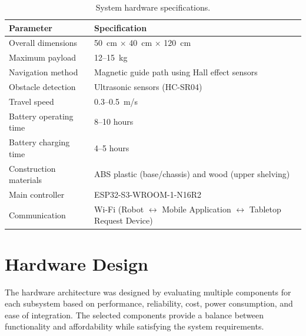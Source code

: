 \documentclass[12pt,a4paper]{article}
\begin{document}
\begin{table}[H]
\centering
\caption{System hardware specifications.}
\label{tab:system_specifications}
\renewcommand{\arraystretch}{1.2}
\begin{tabular}{@{}p{5cm}p{7.5cm}@{}}
\toprule
\textbf{Parameter} & \textbf{Specification} \\
\midrule
Overall dimensions & 50~cm $\times$ 40~cm $\times$ 120~cm \\

Maximum payload & 12--15~kg \\

Navigation method & Magnetic guide path using Hall effect sensors \\

Obstacle detection & Ultrasonic sensors (HC-SR04) \\

Travel speed & 0.3--0.5~m/s \\

Battery operating time & 8--10 hours \\

Battery charging time & 4--5 hours \\

Construction materials & ABS plastic (base/chassis) and wood (upper shelving) \\

Main controller & ESP32-S3-WROOM-1-N16R2 \\

Communication & Wi-Fi (Robot $\leftrightarrow$ Mobile Application $\leftrightarrow$ Tabletop Request Device) \\
\bottomrule
\end{tabular}
\end{table}

\section{Hardware Design}

The hardware architecture was designed by evaluating multiple
components for each subsystem based on performance, reliability,
cost, power consumption, and ease of integration. The selected
components provide a balance between functionality and affordability
while satisfying the system requirements.

\end{document}
